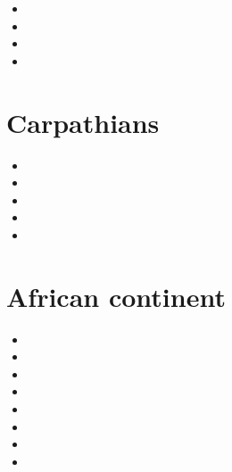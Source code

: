 \begin{small}
\begin{itemize}
\item[\twothousandseven]
\item[\twothousandthirteen]
\item[\twothousandfourteen]
\item[\twothousandfifteen]
\end{itemize}
\end{small}

\section{Carpathians}

\begin{small}
\begin{itemize}
\item[\twothousand]
\item[\twothousandfour]
\item[\twothousandfive]
\item[\twothousandsix]
\item[\twothousandnineteen]
\end{itemize}
\end{small}

\section{African continent}

\begin{small}
\begin{itemize}
\item[\nineteenninetyfour]
\item[\nineteenninetynine]
\item[\twothousandeleven]
\item[\twothousandtwelve]
\item[\twothousandfourteen]
\item[\twothousandseventeen]
\item[\twothousandeighteen]
\item[\twothousandtwenty]
\end{itemize}
\end{small}

